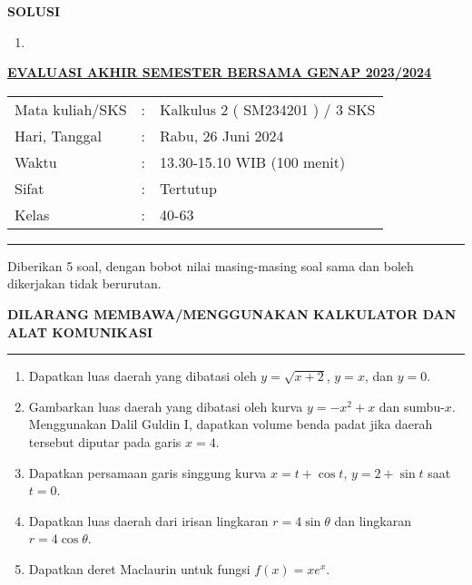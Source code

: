 \documentclass[11pt,openany,a4paper]{article}
\begin{document}
    \newpage
    \pagestyle{solution}
    {\centering\textbf{SOLUSI}}

    \begin{enumerate}
      \item 
    \end{enumerate}

    \newpage
    \pagestyle{problems}
    
    \begin{center}
	{\underline{\textbf{\MakeUppercase{Evaluasi Akhir Semester Bersama Genap 2023/2024}}}}
    \end{center}

    \begin{center}
	\begin{tabular}{lcl}
		Mata kuliah/SKS & : & Kalkulus 2 ( SM234201 ) / 3 SKS\\
		Hari, Tanggal & : & Rabu, 26 Juni 2024\\
		Waktu & : & 13.30-15.10 WIB (100 menit)\\
		Sifat & : & Tertutup\\
		Kelas & : & 40-63
	\end{tabular}
    \end{center}
	
    \noindent\rule{\textwidth}{2.pt}
	
    \setlength{\parindent}{5pt}
    \par Diberikan 5 soal, dengan bobot nilai masing-masing soal sama dan boleh dikerjakan tidak berurutan.
    \setlength{\parindent}{5pt}
    \setlength{\parindent}{5pt}
    {\small
    \par \textbf{\MakeUppercase{Dilarang membawa/menggunakan kalkulator dan alat komunikasi}}
    }
    \par {}
	
    \noindent\rule{\textwidth}{2.pt}
	
\begin{enumerate}
    \item Dapatkan luas daerah yang dibatasi oleh \( y = \sqrt{x + 2} \), \( y = x \), dan \( y = 0 \).

    \item Gambarkan luas daerah yang dibatasi oleh kurva \( y = -x^2 + x \) dan sumbu-\( x \). 
    Menggunakan Dalil Guldin I, dapatkan volume benda padat jika daerah tersebut diputar pada garis \( x = 4 \).

    \item Dapatkan persamaan garis singgung kurva \( x = t + \cos t \), \( y = 2 + \sin t \) saat \( t = 0 \).

    \item Dapatkan luas daerah dari irisan lingkaran \( r = 4 \sin \theta \) dan lingkaran \( r = 4 \cos \theta \).

    \item Dapatkan deret Maclaurin untuk fungsi \( f(x) = xe^x \).
\end{enumerate}
	
\end{document}
